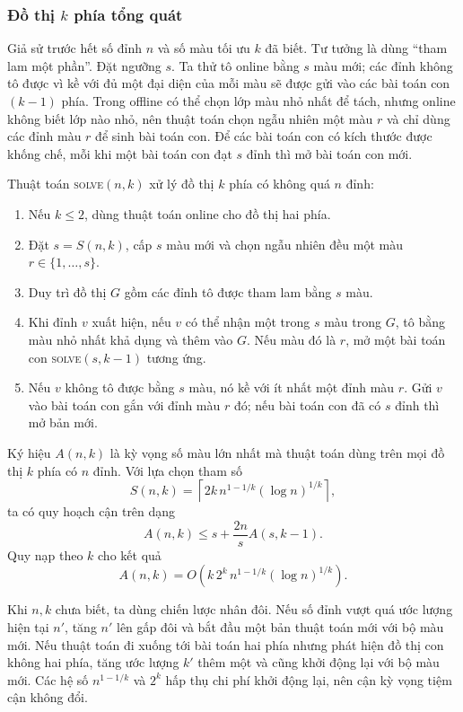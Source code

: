 \documentclass[11pt]{article}
\begin{document}
\subsubsection{\texorpdfstring{Đồ thị $k$ phía tổng quát}{Đồ thị k phía tổng quát}}

Giả sử trước hết số đỉnh $n$ và số màu tối ưu $k$ đã biết. Tư tưởng là dùng
``tham lam một phần''. Đặt ngưỡng $s$. Ta thử tô online bằng $s$ màu mới; các
đỉnh không tô được vì kề với đủ một đại diện của mỗi màu sẽ được gửi vào các
bài toán con $(k-1)$ phía. Trong offline có thể chọn lớp màu nhỏ nhất để tách,
nhưng online không biết lớp nào nhỏ, nên thuật toán chọn ngẫu nhiên một màu
$r$ và chỉ dùng các đỉnh màu $r$ để sinh bài toán con. Để các bài toán con có
kích thước được khống chế, mỗi khi một bài toán con đạt $s$ đỉnh thì mở bài
toán con mới.

Thuật toán \textsc{solve}$(n,k)$ xử lý đồ thị $k$ phía có không quá $n$ đỉnh:
\begin{enumerate}
  \item Nếu $k\le 2$, dùng thuật toán online cho đồ thị hai phía.
  \item Đặt $s=S(n,k)$, cấp $s$ màu mới và chọn ngẫu nhiên đều một màu
  $r\in\{1,\ldots,s\}$.
  \item Duy trì đồ thị $G$ gồm các đỉnh tô được tham lam bằng $s$ màu.
  \item Khi đỉnh $v$ xuất hiện, nếu $v$ có thể nhận một trong $s$ màu trong
  $G$, tô bằng màu nhỏ nhất khả dụng và thêm vào $G$. Nếu màu đó là $r$, mở một
  bài toán con \textsc{solve}$(s,k-1)$ tương ứng.
  \item Nếu $v$ không tô được bằng $s$ màu, nó kề với ít nhất một đỉnh màu
  $r$. Gửi $v$ vào bài toán con gắn với đỉnh màu $r$ đó; nếu bài toán con đã có
  $s$ đỉnh thì mở bản mới.
\end{enumerate}

Ký hiệu $A(n,k)$ là kỳ vọng số màu lớn nhất mà thuật toán dùng trên mọi đồ thị
$k$ phía có $n$ đỉnh. Với lựa chọn tham số
\[
  S(n,k)=\left\lceil 2k\, n^{1-1/k}(\log n)^{1/k}\right\rceil,
\]
ta có quy hoạch cận trên dạng
\[
  A(n,k)\le s+\frac{2n}{s}A(s,k-1).
\]
Quy nạp theo $k$ cho kết quả
\[
  A(n,k)=O\!\left(k\,2^k\, n^{1-1/k}(\log n)^{1/k}\right).
\]

Khi $n,k$ chưa biết, ta dùng chiến lược nhân đôi. Nếu số đỉnh vượt quá ước
lượng hiện tại $n'$, tăng $n'$ lên gấp đôi và bắt đầu một bản thuật toán mới
với bộ màu mới. Nếu thuật toán đi xuống tới bài toán hai phía nhưng phát hiện
đồ thị con không hai phía, tăng ước lượng $k'$ thêm một và cũng khởi động lại
với bộ màu mới. Các hệ số $n^{1-1/k}$ và $2^k$ hấp thụ chi phí khởi động lại,
nên cận kỳ vọng tiệm cận không đổi.
\end{document}

